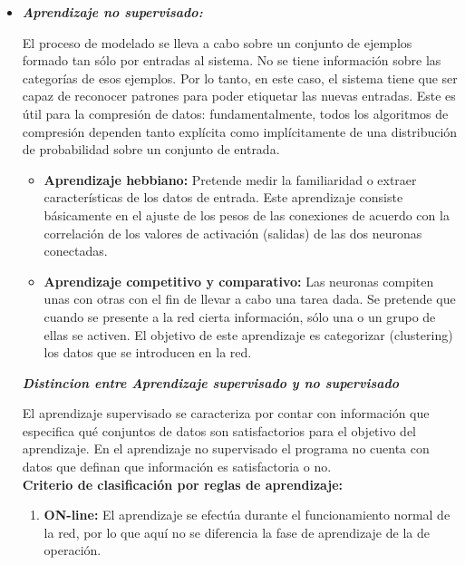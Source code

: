 \documentclass[journal]{IEEEtran}
\begin{document}
\begin{itemize}
\item \textbf{\emph{Aprendizaje no supervisado:}}
        
El proceso de modelado se lleva a cabo sobre un conjunto de ejemplos formado tan sólo por entradas al sistema. No se tiene información sobre las categorías de esos ejemplos. Por lo tanto, en este caso, el sistema tiene que ser capaz de reconocer patrones para poder etiquetar las nuevas entradas. Este es útil para la compresión de datos: fundamentalmente, todos los algoritmos de compresión dependen tanto explícita como implícitamente de una distribución de probabilidad sobre un conjunto de entrada.\\

\begin{itemize}
\item \textbf{Aprendizaje hebbiano:}
Pretende medir la familiaridad o extraer características de los datos de entrada. Este aprendizaje consiste básicamente en el ajuste de los pesos de las conexiones de acuerdo con la correlación de los valores de activación (salidas) de las dos neuronas conectadas.\\

\item \textbf{Aprendizaje competitivo y comparativo:}
Las neuronas compiten unas con otras con el fin de llevar a cabo una tarea dada. Se pretende que cuando se presente a la red cierta información, sólo una o un grupo de ellas se activen. El objetivo de este aprendizaje es categorizar (clustering) los datos que se introducen en la red.\\
\end{itemize}
 
\begin{center}
\textbf{\emph{Distincion entre Aprendizaje supervisado y no supervisado}}
\end{center}
    		
El aprendizaje supervisado se caracteriza por contar con información que especifica qué conjuntos de datos son satisfactorios para el objetivo del aprendizaje. En el aprendizaje no supervisado el programa no cuenta con datos que definan que información es satisfactoria o no.\\

\textbf{Criterio de clasificación por reglas de aprendizaje:}
\begin{enumerate}
\item \textbf{ON-line:}
El aprendizaje se efectúa durante el funcionamiento normal de la red, por lo que aquí no se diferencia la fase de aprendizaje de la de operación.\\


\end{enumerate}
\end{itemize}
\end{document}
